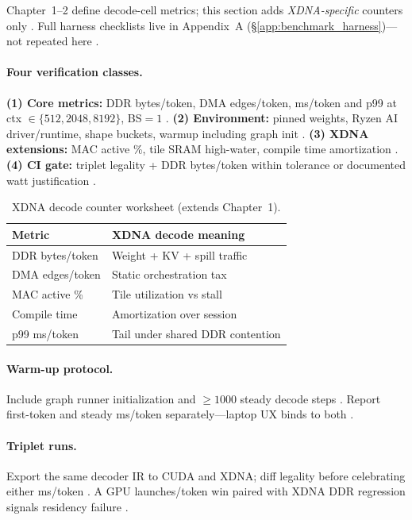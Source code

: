Chapter~1--2 define decode-cell metrics; this section adds \emph{XDNA-specific} counters only \citep{taxbreak2026,memoryfloor2026}.
Full harness checklists live in Appendix~A (\S\ref{app:benchmark_harness})---not repeated here \citep{yirage2026}.

\paragraph{Four verification classes.}
\textbf{(1) Core metrics:} DDR bytes/token, DMA edges/token, ms/token and p99 at ctx $\in\{512,2048,8192\}$, BS${=}1$ \citep{memoryfloor2026,taxbreak2026}.
\textbf{(2) Environment:} pinned weights, Ryzen AI driver/runtime, shape buckets, warmup including graph init \citep{amd2024xdna,amd2024aie}.
\textbf{(3) XDNA extensions:} MAC active \%, tile SRAM high-water, compile time amortization \citep{patel2025llminference,yirage2026}.
\textbf{(4) CI gate:} triplet legality + DDR bytes/token within tolerance or documented watt justification \citep{chen2020compilerbasedhardw,amd2024xdna}.

\begin{table}[t]
\centering
\small
\caption{XDNA decode counter worksheet (extends Chapter~1).}
\label{tab:ch05_ryzen_benchmark}
\begin{tabular}{@{}ll@{}}
\toprule
\textbf{Metric} & \textbf{XDNA decode meaning} \\
\midrule
DDR bytes/token & Weight + KV + spill traffic \\
DMA edges/token & Static orchestration tax \\
MAC active \% & Tile utilization vs stall \\
Compile time & Amortization over session \\
p99 ms/token & Tail under shared DDR contention \\
\bottomrule
\end{tabular}
\end{table}

\paragraph{Warm-up protocol.}
Include graph runner initialization and ${\ge}1000$ steady decode steps \citep{yirage2026,patel2025llminference}.
Report first-token and steady ms/token separately---laptop UX binds to both \citep{kwon2023vllm,amd2024xdna}.

\paragraph{Triplet runs.}
Export the same decoder IR to CUDA and XDNA; diff legality before celebrating either ms/token \citep{yirage2026,chen2020compilerbasedhardw,amd2024xdna}.
A GPU launches/token win paired with XDNA DDR regression signals residency failure \citep{memoryfloor2026,patel2025llminference}.

